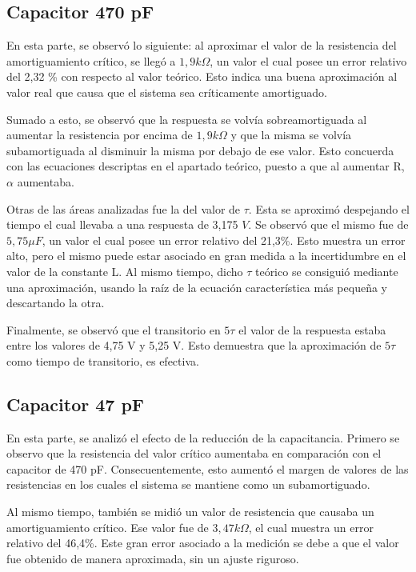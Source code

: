 \documentclass{article}
\begin{document}
        \subsection*{Capacitor 470 pF}
        	En esta parte, se observó lo siguiente: al aproximar el valor de la resistencia del amortiguamiento crítico, se llegó a $1,9 k\Omega$, un valor el cual posee un error relativo del 2,32 \% con respecto al valor teórico. Esto indica una buena aproximación al valor real que causa que el sistema sea críticamente amortiguado. \par
	Sumado a esto, se observó que la respuesta se volvía sobreamortiguada al aumentar la resistencia por encima de $1,9 k\Omega$ y que la misma se volvía subamortiguada al disminuir la misma por debajo de ese valor. Esto concuerda con las ecuaciones descriptas en el apartado teórico, puesto a que al aumentar R, $\alpha$ aumentaba. \par
	Otras de las áreas analizadas fue la del valor de $\tau$. Esta se aproximó despejando el tiempo el cual llevaba a una respuesta de 3,175 $V$. Se observó que el mismo fue de $5,75 \mu F$, un valor el cual posee un error relativo del 21,3\%. Esto muestra un error alto, pero el mismo puede estar asociado en gran medida a la incertidumbre en el valor de la constante L. Al mismo tiempo, dicho $\tau$ teórico se consiguió mediante una aproximación, usando la raíz de la ecuación característica más pequeña y descartando la otra.\par
	Finalmente, se observó que el transitorio en $5\tau$ el valor de la respuesta estaba entre los valores de 4,75 V y 5,25 V. Esto demuestra que la aproximación de $5\tau$ como tiempo de transitorio, es efectiva.
	
	
        \subsection*{Capacitor 47 pF}
        En esta parte, se analizó el efecto de la reducción de la capacitancia. Primero se observo que la resistencia del valor crítico aumentaba en comparación con el capacitor de 470 pF. Consecuentemente, esto aumentó el margen de valores de las resistencias en los cuales el sistema se mantiene como un subamortiguado.\par
        Al mismo tiempo, también se midió un valor de resistencia que causaba un amortiguamiento crítico. Ese valor fue de $3,47 k\Omega$, el cual muestra un error relativo del 46,4\%. Este gran error asociado a la medición se debe a que el valor fue obtenido de manera aproximada, sin un ajuste riguroso.\par 
        
\end{document}

